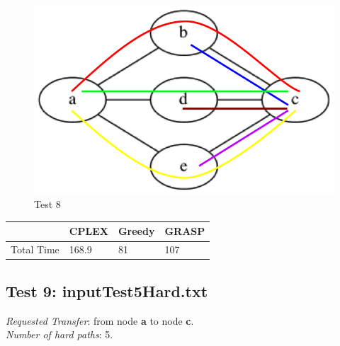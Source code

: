 \documentclass[11pt,a4paper]{article}
\begin{document}
\begin{figure}[H]
  \centering
    \includegraphics[scale=0.7]{inputTest3Hard.png}
  \caption{Test 8}
  \label{fig:test8}
\end{figure}

\begin{tabular}{| l | l | l | l |}
\hline
 & CPLEX & Greedy & GRASP \\ \hline
Total Time & 168.9 & 81 & 107 \\ \hline
\end{tabular}

\subsection{Test 9: inputTest5Hard.txt}

\textit{Requested Transfer}: from node \textbf{a} to node \textbf{c}.\\
\textit{Number of hard paths}: 5.\\
\end{document}
